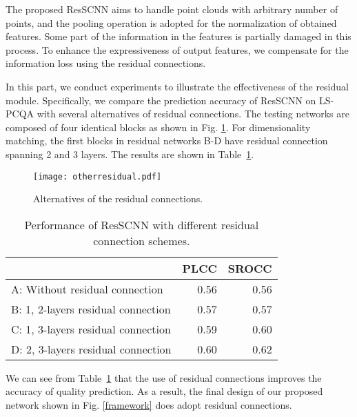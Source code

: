 \documentclass[acmsmall]{acmart}
\begin{document}
\par The proposed ResSCNN aims to handle point clouds with arbitrary number of points, and the pooling operation is adopted for the normalization of obtained features. Some part of the information in the features is partially damaged in this process. To enhance the expressiveness of output features, we compensate for the information loss using the residual connections.
\par In this part, we conduct experiments to illustrate the effectiveness of the residual module. Specifically, we compare the prediction accuracy of ResSCNN on LS-PCQA with several alternatives of residual connections. The testing networks are composed of four identical blocks as shown in Fig. \ref{otherresidual}. For dimensionality matching, the first blocks in residual networks B-D have residual connection spanning 2 and 3 layers. The results are shown in Table~\ref{reseffect}.

\begin{figure}[htbp]
	\centering
	\texttt{[image: otherresidual.pdf]}
	\caption{Alternatives of the residual connections.}
	\label{otherresidual}

\end{figure}


\begin{table}[htbp]
  \centering
  \caption{Performance of ResSCNN with different residual connection schemes.}
  \begin{footnotesize}
    \begin{tabular}{l|rr}
    \hline
          & \multicolumn{1}{l}{PLCC} & \multicolumn{1}{l}{SROCC} \\
    \hline
    A: Without residual connection & 0.56  & 0.56  \\
    B: 1, 2-layers residual connection  & 0.57  & 0.57  \\
    C: 1, 3-layers residual connection  & 0.59  & 0.60  \\
    D: 2, 3-layers residual connection  & 0.60  & 0.62  \\
    \hline
    \end{tabular}\end{footnotesize}
  \label{reseffect}\end{table}


\par We can see from Table~\ref{reseffect} that the use of residual connections improves the accuracy of quality prediction. As a result, the final design of our proposed network shown in Fig. \ref{framework} does adopt residual connections.
\end{document}
